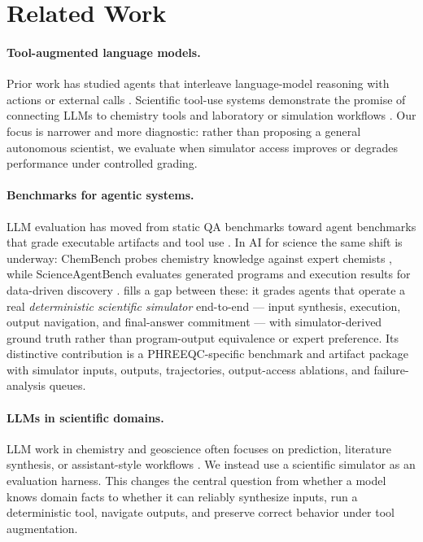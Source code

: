 \documentclass{article}
\begin{document}
\section{Related Work}

\paragraph{Tool-augmented language models.}
Prior work has studied agents that interleave language-model reasoning with actions or external calls \citep{yao2023react,schick2023toolformer}. Scientific tool-use systems demonstrate the promise of connecting LLMs to chemistry tools and laboratory or simulation workflows \citep{bran2024chemcrow,boiko2023autonomous}. Our focus is narrower and more diagnostic: rather than proposing a general autonomous scientist, we evaluate when simulator access improves or degrades performance under controlled grading.

\paragraph{Benchmarks for agentic systems.}
LLM evaluation has moved from static QA benchmarks toward agent benchmarks that grade executable artifacts and tool use \citep{rein2023gpqa,jimenez2024swebench}. In AI for science the same shift is underway: ChemBench probes chemistry knowledge against expert chemists \citep{mirza2025chembench}, while ScienceAgentBench evaluates generated programs and execution results for data-driven discovery \citep{chen2025scienceagentbench}. \BenchName{} fills a gap between these: it grades agents that operate a real \emph{deterministic scientific simulator} end-to-end --- input synthesis, execution, output navigation, and final-answer commitment --- with simulator-derived ground truth rather than program-output equivalence or expert preference. Its distinctive contribution is a PHREEQC-specific benchmark and artifact package with simulator inputs, outputs, trajectories, output-access ablations, and failure-analysis queues.

\paragraph{LLMs in scientific domains.}
LLM work in chemistry and geoscience often focuses on prediction, literature synthesis, or assistant-style workflows \citep{jablonka2024leveraging}. We instead use a scientific simulator as an evaluation harness. This changes the central question from whether a model knows domain facts to whether it can reliably synthesize inputs, run a deterministic tool, navigate outputs, and preserve correct behavior under tool augmentation.
\end{document}
